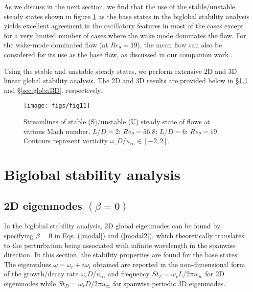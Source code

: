 \documentclass{jfm}
\begin{document}
As we discuss in the next section, we find that the use of the stable/unstable steady states shown in figure \ref{fig:uss} as the base states in the biglobal stability analysis yields excellent agreement in the oscillatory features in most of the cases except for a very limited number of cases where the wake mode dominates the flow. For the wake-mode dominated flow (at $Re_\theta=19$), the mean flow can also be considered for its use as the base flow, as discussed in our companion work \citep{Sun:TCFD16}.  

Using the stable and unstable steady states, we perform extensive 2D and 3D linear global stability analysis.  The 2D and 3D results are provided below in \S \ref{sec:global2D} and \S \ref{sec:global3D}, respectively.
 
\begin{figure}
\begin{center}
   \texttt{[image: figs/fig11]}
   \caption{Streamlines of stable (S)/unstable (U) steady state of flows at various Mach number. $L/D=2$: $Re_\theta=56.8$; $L/D=6$: $Re_\theta=19$. Contours represent vorticity $\omega_z D/u_\infty\in[-2,2]$.}
   \label{fig:uss} 
\end{center}
\end{figure}

\section{Biglobal stability analysis}
\label{sec:biglobal}
\subsection{2D eigenmodes $(\beta=0)$}
\label{sec:global2D}
In the biglobal stability analysis, 2D global eigenmodes can be found by specifying $\beta=0$ in Eqs. (\ref{modal}) and (\ref{modal2}), which theoretically translates to the perturbation being associated with infinite wavelength in the spanwise direction. In this section, the stability properties are found for the base states. The eigenvalues $\omega=\omega_r+i\omega_i$ obtained are reported in the non-dimensional form of the growth/decay rate $\omega_i D/u_\infty$ and frequency $St_L=\omega_r L/2\pi u_\infty$ for 2D eigenmodes while $St_D=\omega_r D/2\pi u_\infty$ for spanwise periodic 3D eigenmodes.
\end{document}
